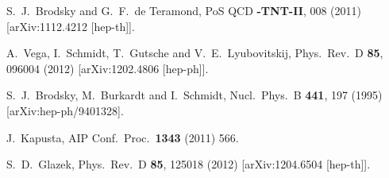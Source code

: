 \documentclass[prd,aps,onecolumn,nofootinbib]{revtex4}
\begin{document}
\begin{thebibliography}{99}
  S.~J.~Brodsky and G.~F.~de Teramond,
  PoS QCD {\bf -TNT-II}, 008 (2011)
  [arXiv:1112.4212 [hep-th]].

  A.~Vega, I.~Schmidt, T.~Gutsche and V.~E.~Lyubovitskij,
  Phys.\ Rev.\  D {\bf 85}, 096004 (2012)
  [arXiv:1202.4806 [hep-ph]].

  S.~J.~Brodsky, M.~Burkardt and I.~Schmidt,
  Nucl.\ Phys.\  B {\bf 441}, 197 (1995)
  [arXiv:hep-ph/9401328].
  
  J.~Kapusta,
  AIP Conf.\ Proc.\  {\bf 1343} (2011) 566.
  
  S.~D.~Glazek,
  Phys.\ Rev.\ D {\bf 85}, 125018 (2012)
  [arXiv:1204.6504 [hep-th]].


\end{thebibliography}
\end{document}

